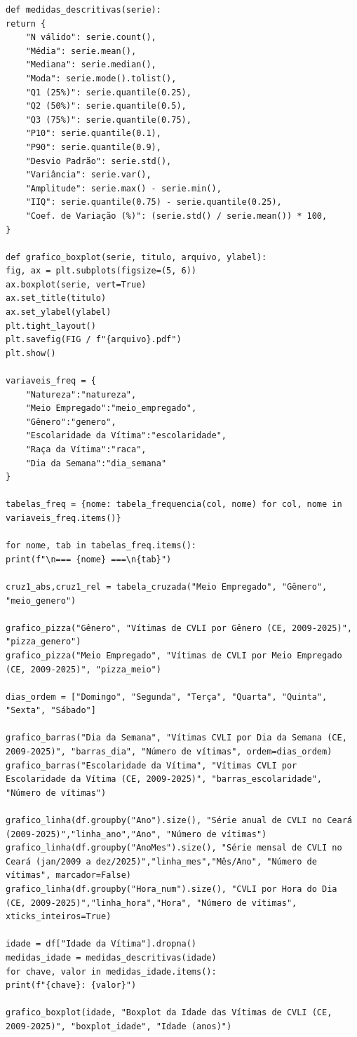 \documentclass[12pt,a4paper]{article}
\begin{document}
\begin{lstlisting}[style=python,caption={Rotina computacional completa utilizada na análise descritiva},captionpos=b]
def medidas_descritivas(serie):
return {
	"N válido": serie.count(),
	"Média": serie.mean(),
	"Mediana": serie.median(),
	"Moda": serie.mode().tolist(),
	"Q1 (25%)": serie.quantile(0.25),
	"Q2 (50%)": serie.quantile(0.5),
	"Q3 (75%)": serie.quantile(0.75),
	"P10": serie.quantile(0.1),
	"P90": serie.quantile(0.9),
	"Desvio Padrão": serie.std(),
	"Variância": serie.var(),
	"Amplitude": serie.max() - serie.min(),
	"IIQ": serie.quantile(0.75) - serie.quantile(0.25),
	"Coef. de Variação (%)": (serie.std() / serie.mean()) * 100,
}

def grafico_boxplot(serie, titulo, arquivo, ylabel):
fig, ax = plt.subplots(figsize=(5, 6))
ax.boxplot(serie, vert=True)
ax.set_title(titulo)
ax.set_ylabel(ylabel)
plt.tight_layout()
plt.savefig(FIG / f"{arquivo}.pdf")
plt.show()

variaveis_freq = {
	"Natureza":"natureza",
	"Meio Empregado":"meio_empregado",
	"Gênero":"genero",
	"Escolaridade da Vítima":"escolaridade",
	"Raça da Vítima":"raca",
	"Dia da Semana":"dia_semana"
}

tabelas_freq = {nome: tabela_frequencia(col, nome) for col, nome in variaveis_freq.items()}

for nome, tab in tabelas_freq.items():
print(f"\n=== {nome} ===\n{tab}")

cruz1_abs,cruz1_rel = tabela_cruzada("Meio Empregado", "Gênero", "meio_genero")

grafico_pizza("Gênero", "Vítimas de CVLI por Gênero (CE, 2009-2025)", "pizza_genero")
grafico_pizza("Meio Empregado", "Vítimas de CVLI por Meio Empregado (CE, 2009-2025)", "pizza_meio")

dias_ordem = ["Domingo", "Segunda", "Terça", "Quarta", "Quinta", "Sexta", "Sábado"]

grafico_barras("Dia da Semana", "Vítimas CVLI por Dia da Semana (CE, 2009-2025)", "barras_dia", "Número de vítimas", ordem=dias_ordem)
grafico_barras("Escolaridade da Vítima", "Vítimas CVLI por Escolaridade da Vítima (CE, 2009-2025)", "barras_escolaridade", "Número de vítimas")

grafico_linha(df.groupby("Ano").size(), "Série anual de CVLI no Ceará (2009-2025)","linha_ano","Ano", "Número de vítimas")
grafico_linha(df.groupby("AnoMes").size(), "Série mensal de CVLI no Ceará (jan/2009 a dez/2025)","linha_mes","Mês/Ano", "Número de vítimas", marcador=False)
grafico_linha(df.groupby("Hora_num").size(), "CVLI por Hora do Dia (CE, 2009-2025)","linha_hora","Hora", "Número de vítimas", xticks_inteiros=True)

idade = df["Idade da Vítima"].dropna()
medidas_idade = medidas_descritivas(idade)
for chave, valor in medidas_idade.items():
print(f"{chave}: {valor}")

grafico_boxplot(idade, "Boxplot da Idade das Vítimas de CVLI (CE, 2009-2025)", "boxplot_idade", "Idade (anos)")
\end{lstlisting}
\end{document}
